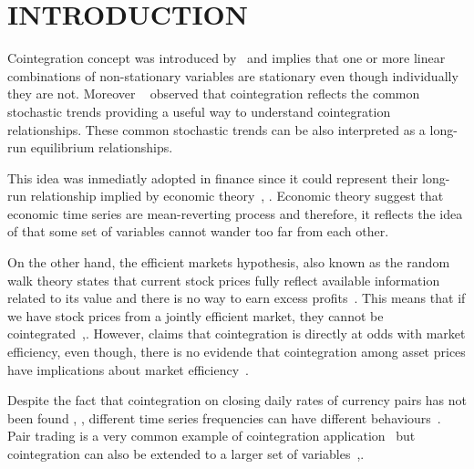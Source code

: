 \section{\uppercase{Introduction}}
\label{sec:introduction}
\noindent 

Cointegration concept was introduced by~\cite{engle1987} and implies that one or
more linear combinations of non-stationary variables are stationary even though
individually they are not.  Moreover ~\cite{stock+watson1988} observed that
cointegration reflects the common stochastic trends providing a useful way to
understand cointegration relationships. These common stochastic trends can be
also interpreted as a long-run equilibrium relationships.

This idea was inmediatly adopted in finance since it could represent their
long-run relationship implied by economic theory~\cite{laietAl1991},
\cite{lence+falk2005}.  Economic theory suggest that economic time series are
mean-reverting process and therefore, it reflects the idea of that some set of
variables cannot wander too far from each other. 

On the other hand, the efficient markets hypothesis, also known as the random
walk theory states that current stock prices fully reflect available
information related to its value and there is no way to earn excess
profits~\cite{fama1970}.  This means that if we have stock prices from a
jointly efficient market, they cannot be
cointegrated~\cite{granger1986},\cite{dwyer1992}. However, \cite{richards1995}
claims that cointegration is directly at odds with market efficiency, even
though, there is no evidende that cointegration among asset prices have
implications about market efficiency~\cite{lence+falk2005}.

Despite the fact that cointegration on closing daily rates of currency pairs has
not been found \cite{coleman1990}, \cite{copeland1991}, different time series
frequencies can have different behaviours~\cite{aldridge2009}. Pair trading is a
very common example of cointegration application~\cite{herlemont2003} 
but cointegration can also be extended to a larger set of
variables~\cite{mukherjee1995},\cite{engle2004}.



